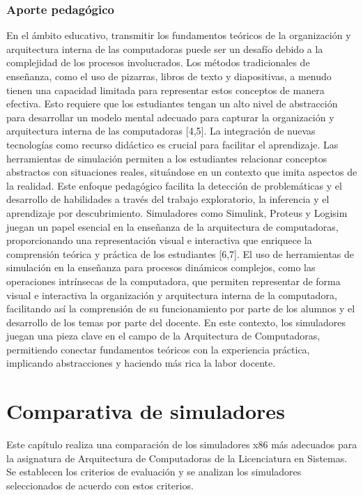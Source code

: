 \documentclass[12pt,twoside]{templates/unerthesis}
\begin{document}
\hypertarget{aporte-pedaguxf3gico}{%
\subsection{Aporte pedagógico}\label{aporte-pedaguxf3gico}}

En el ámbito educativo, transmitir los fundamentos teóricos de la organización y arquitectura interna de las computadoras puede ser un desafío debido a la complejidad de los procesos involucrados. Los métodos tradicionales de enseñanza, como el uso de pizarras, libros de texto y diapositivas, a menudo tienen una capacidad limitada para representar estos conceptos de manera efectiva. Esto requiere que los estudiantes tengan un alto nivel de abstracción para desarrollar un modelo mental adecuado para capturar la organización y arquitectura interna de las computadoras {[}4,5{]}.
La integración de nuevas tecnologías como recurso didáctico es crucial para facilitar el aprendizaje. Las herramientas de simulación permiten a los estudiantes relacionar conceptos abstractos con situaciones reales, situándose en un contexto que imita aspectos de la realidad. Este enfoque pedagógico facilita la detección de problemáticas y el desarrollo de habilidades a través del trabajo exploratorio, la inferencia y el aprendizaje por descubrimiento. Simuladores como Simulink, Proteus y Logisim juegan un papel esencial en la enseñanza de la arquitectura de computadoras, proporcionando una representación visual e interactiva que enriquece la comprensión teórica y práctica de los estudiantes {[}6,7{]}.
El uso de herramientas de simulación en la enseñanza para procesos dinámicos complejos, como las operaciones intrínsecas de la computadora, que permiten representar de forma visual e interactiva la organización y arquitectura interna de la computadora, facilitando así la comprensión de su funcionamiento por parte de los alumnos y el desarrollo de los temas por parte del docente. En este contexto, los simuladores juegan una pieza clave en el campo de la Arquitectura de Computadoras, permitiendo conectar fundamentos teóricos con la experiencia práctica, implicando abstracciones y haciendo más rica la labor docente.

\hypertarget{comparativa-de-simuladores}{%
\chapter{Comparativa de simuladores}\label{comparativa-de-simuladores}}

Este capítulo realiza una comparación de los simuladores x86 más adecuados para la asignatura de Arquitectura de Computadoras de la Licenciatura en Sistemas. Se establecen los criterios de evaluación y se analizan los simuladores seleccionados de acuerdo con estos criterios.
\end{document}

